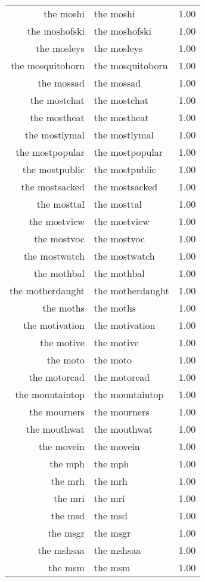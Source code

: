 \begin{table}[ht]
\begin{tabular}{rlr}
  the moshi & the moshi & 1.00 \\ 
  the moshofski & the moshofski & 1.00 \\ 
  the mosleys & the mosleys & 1.00 \\ 
  the mosquitoborn & the mosquitoborn & 1.00 \\ 
  the mossad & the mossad & 1.00 \\ 
  the mostchat & the mostchat & 1.00 \\ 
  the mostheat & the mostheat & 1.00 \\ 
  the mostlymal & the mostlymal & 1.00 \\ 
  the mostpopular & the mostpopular & 1.00 \\ 
  the mostpublic & the mostpublic & 1.00 \\ 
  the mostsacked & the mostsacked & 1.00 \\ 
  the mosttal & the mosttal & 1.00 \\ 
  the mostview & the mostview & 1.00 \\ 
  the mostvoc & the mostvoc & 1.00 \\ 
  the mostwatch & the mostwatch & 1.00 \\ 
  the mothbal & the mothbal & 1.00 \\ 
  the motherdaught & the motherdaught & 1.00 \\ 
  the moths & the moths & 1.00 \\ 
  the motivation & the motivation & 1.00 \\ 
  the motive & the motive & 1.00 \\ 
  the moto & the moto & 1.00 \\ 
  the motorcad & the motorcad & 1.00 \\ 
  the mountaintop & the mountaintop & 1.00 \\ 
  the mourners & the mourners & 1.00 \\ 
  the mouthwat & the mouthwat & 1.00 \\ 
  the movein & the movein & 1.00 \\ 
  the mph & the mph & 1.00 \\ 
  the mrh & the mrh & 1.00 \\ 
  the mri & the mri & 1.00 \\ 
  the msd & the msd & 1.00 \\ 
  the msgr & the msgr & 1.00 \\ 
  the mshsaa & the mshsaa & 1.00 \\ 
  the msm & the msm & 1.00 \\ 

\end{tabular}
\end{table}
